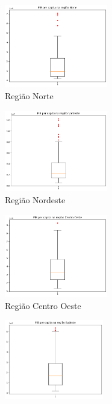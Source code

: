 \begin{figure}[H] 
    \centering
    \begin{subfigure}{5cm}
      \centering 
      \includegraphics[width=4.5cm]{../figuras/graficos/boxplot-pib-cc-n.png}
      \caption{Região Norte}
      \label{fig:boxplot-n}
    \end{subfigure}
    \hfill 
    \begin{subfigure}{5cm}
        \centering 
        \includegraphics[width=4.5cm]{../figuras/graficos/boxplot-pib-cc-ne.png}
        \caption{Região Nordeste}
        \label{fig:boxplot-ne}
    \end{subfigure}
    \begin{subfigure}{5cm}
        \centering 
        \includegraphics[width=4.5cm]{../figuras/graficos/boxplot-pib-cc-co.png}
        \caption{Região Centro Oeste}
        \label{fig:boxplot-co}
    \end{subfigure}
    \begin{subfigure}{5cm}
        \centering 
        \includegraphics[width=4.3cm]{../figuras/graficos/boxplot-pib-cc-se.png}

\end{subfigure}
\end{figure}
